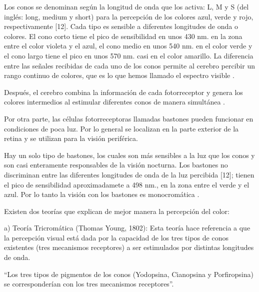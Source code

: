 \documentclass[10pt]{article}
\begin{document}
Los conos se denominan según la longitud de onda que los activa: L, M y S (del inglés: long, medium y short) para la percepción de los colores azul, verde y rojo, respectivamente [12]. Cada tipo es sensible a diferentes longitudes de onda o colores. El cono corto tiene el pico de sensibilidad en unos 430 nm. en la zona entre el color violeta y el azul, el cono medio en unos 540 nm. en el color verde y el cono largo tiene el pico en unos 570 nm. casi en el color amarillo. La diferencia entre las señales recibidas de cada uno de los conos permite al cerebro percibir un rango continuo de colores, que es lo que hemos llamado el espectro visible \cite{IEEEreferencias:Ref13}.

\setlength{\parskip}{2mm}

Después, el cerebro combina la información de cada fotorreceptor y genera los colores intermedios al estimular diferentes conos de manera simultánea \cite{IEEEreferencias:Ref12}.

\setlength{\parskip}{2mm}

Por otra parte, las células fotorreceptoras llamadas bastones pueden funcionar en condiciones de poca luz. Por lo general se localizan en la parte exterior de la retina y se utilizan para la visión periférica.

\setlength{\parskip}{2mm}

Hay un solo tipo de bastones, los cuales son más sensibles a la luz que los conos y son casi enteramente responsables de la visión nocturna. Los bastones no discriminan entre las diferentes longitudes de onda de la luz percibida [12]; tienen el pico de sensibilidad aproximadamete a 498 nm., en la zona entre el verde y el azul. Por lo tanto la visión con los bastones es monocromática \cite{IEEEreferencias:Ref13}.

\setlength{\parskip}{2mm}

Existen dos teorías que explican de mejor manera la percepción del color:

a)	Teoría Tricromática (Thomas Young, 1802):
 Esta teoría hace referencia a que la  percepción visual está dada por la capacidad de los tres tipos de conos existentes (tres mecanismos receptores) a ser estimulados por distintas longitudes de onda. 
 
\setlength{\parskip}{2mm} 
 
“Los tres tipos de pigmentos de los conos (Yodopsina, Cianopsina y Porfiropsina) se corresponderían con los tres mecanismos receptores”\cite{IEEEreferencias:Ref14}.

\setlength{\parskip}{2mm}
\end{document}
